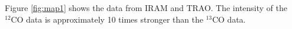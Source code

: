 
Figure \ref{fig:map1} shows the data from IRAM and TRAO. The intensity of the $^{12}\textrm{CO}$ data is approximately 10 times stronger than the $^{13}\textrm{CO}$ data.

